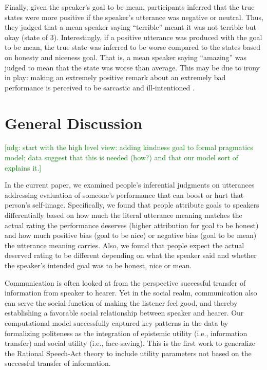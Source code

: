 \documentclass[10pt,letterpaper]{article}
\newcommand{\ndg}[1]{\textcolor{Green}{[ndg: #1]}}
\begin{document}
Finally, given the speaker's goal to be mean, participants inferred that the true states were more positive if the speaker's utterance was negative or neutral. Thus, they judged that a mean speaker saying ``terrible'' meant it was not terrible but okay (state of 3). Interestingly, if a positive utterance was produced with the goal to be mean, the true state was inferred to be worse compared to the states based on honesty and niceness goal. That is, a mean speaker saying ``amazing'' was judged to mean that the state was worse than average. This may be due to irony in play: making an extremely positive remark about an extremely bad performance is perceived to be sarcastic and ill-intentioned \cite{colston1997}. 


\section{General Discussion}

\ndg{start with the high level view: adding kindness goal to formal pragmatics model; data suggest that this is needed (how?) and that our model sort of explains it.}

In the current paper, we examined people's inferential judgments on utterances addressing evaluation of someone's performance that can boost or hurt that person's self-image. Specifically, we found that people attribute goals to speakers differentially based on how much the literal utterance meaning matches the actual rating the performance deserves (higher attribution for goal to be honest) and how much positive bias (goal to be nice) or negative bias (goal to be mean) the utterance meaning carries. Also, we found that people expect the actual deserved rating to be different depending on what the speaker said and whether the speaker's intended goal was to be honest, nice or mean. 

Communication is often looked at from the perspective successful transfer of information from speaker to hearer. 
Yet in the social realm, communication also can serve the social function of making the listener feel good, and thereby establishing a favorable social relationship between speaker and hearer.
Our computational model successfully captured key patterns in the data by formalizing politeness as the integration of epistemic utility (i.e., information transfer) and social utility (i.e., face-saving). This is the first work to generalize the Rational Speech-Act theory to include utility parameters not based on the successful transfer of information. 





\setlength{\bibleftmargin}{.125in}
\setlength{\bibindent}{-\bibleftmargin}


\end{document}
